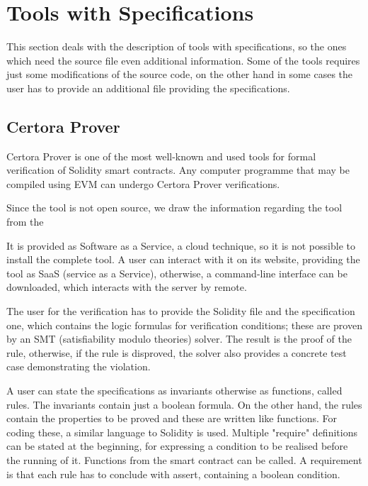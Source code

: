 \section{Tools with Specifications}
\label{sec:Tools:Specification}
This section deals with the description of tools with specifications, so the ones which need the source file even additional information. 
Some of the tools requires just some modifications of the source code, on the other hand in some cases the user has to provide an additional file 
providing the specifications.

\subsection{Certora Prover}
\label{sec:Specification:Certora}
Certora Prover is one of the most well-known and used tools for formal verification of Solidity smart contracts. 
Any computer programme that may be compiled using EVM can undergo Certora Prover verifications. 

Since the tool is not open source, we draw the information regarding the tool from the 

It is provided as Software as a Service, a cloud technique, so it is not possible to install the complete tool. A user can interact with it on its 
website, providing the tool as SaaS (service as a Service), 
otherwise, a command-line interface can be downloaded, which interacts with the server by remote. 

The user for the verification has to provide the Solidity file and the specification one, which contains the logic formulas for verification conditions; these are proven by an SMT (satisfiability modulo theories) solver. 
The result is the proof of the rule, otherwise, if the rule is disproved, the solver also provides a concrete test case demonstrating the violation. 

A user can state the specifications as invariants otherwise as functions, called rules.
The invariants contain just a boolean formula.
On the other hand, the rules contain the properties to be proved and these are written like functions. 
For coding these, a similar language to Solidity is used. 
Multiple "require" definitions can be stated at the beginning, for expressing a condition to be realised before the running of it. Functions from the smart contract can be called.
A requirement is that each rule has to conclude with assert, containing a boolean condition. 

